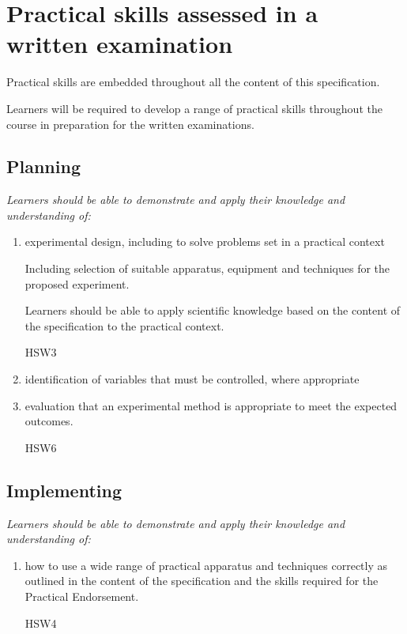 \chapter{Practical skills assessed in a written examination} \label{ocr:1:1}
\begin{spec}
    Practical skills are embedded throughout all the content of this
    specification. 
    \par
    Learners will be required to develop a range of practical skills throughout
    the course in preparation for the written examinations.
\end{spec}

\section{Planning}
\begin{spec}
    \textit{Learners should be able to demonstrate and apply their knowledge and understanding of:}
    \begin{enumerate}
        \item experimental design, including to solve problems set in a practical context
        \par Including selection of suitable apparatus, equipment and techniques for the proposed experiment. 
        \par Learners should be able to apply scientific knowledge based on the content of the specification to the practical context.
        \par HSW3 %
        \item identification of variables that must be controlled, where appropriate
        \item evaluation that an experimental method is appropriate to meet the expected outcomes.
        \par HSW6
    \end{enumerate}
\end{spec}

\section{Implementing}
\begin{spec}
    \textit{Learners should be able to demonstrate and apply their knowledge and understanding of:}
    \begin{enumerate}
        \item how to use a wide range of practical apparatus and techniques correctly as outlined in the content of the specification and the skills required for the Practical Endorsement.
        \par HSW4
    \end{enumerate}
\end{spec}